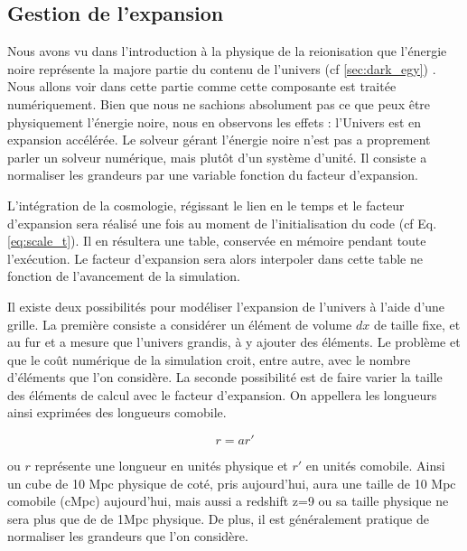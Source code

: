 \subsection{Gestion de l'expansion}
\label{sec:supercomobil}


Nous avons vu dans l'introduction à la physique de la reionisation que l'énergie noire représente la majore partie du contenu de l'univers (cf \ref{sec:dark_egy}) .
Nous allons voir dans cette partie comme cette composante est traitée numériquement.
Bien que nous ne sachions absolument pas ce que peux être physiquement l'énergie noire, nous en observons les effets : l'Univers est en expansion accélérée.
Le solveur gérant l'énergie noire n'est pas a proprement parler un solveur numérique, mais plutôt d'un système d'unité. %
Il consiste a normaliser les grandeurs par une variable fonction du facteur d'expansion.

L'intégration de la cosmologie, régissant le lien en le temps et le facteur d'expansion sera réalisé une fois au moment de l'initialisation du code (cf Eq. \ref{eq:scale_t}).
Il en résultera une table, conservée en mémoire pendant toute l'exécution.
Le facteur d'expansion sera alors interpoler dans cette table ne fonction de l'avancement de la simulation.%

Il existe deux possibilités pour modéliser l'expansion de l'univers à l'aide d'une grille.
La première consiste a considérer un élément de volume $dx$ de taille fixe, et au fur et a mesure que l'univers grandis, à y ajouter des éléments.
Le problème et que le coût numérique de la simulation croit, entre autre, avec le nombre d'éléments que l'on considère.
La seconde possibilité est de faire varier la taille des éléments de calcul avec le facteur d'expansion.
On appellera les longueurs ainsi exprimées des longueurs comobile.

\begin{equation}
r=a r'
\end{equation}

ou $r$ représente une longueur en unités physique et $r'$ en unités comobile.
Ainsi un cube de 10 Mpc physique de coté, pris aujourd'hui, aura une taille de 10 Mpc comobile (cMpc) aujourd'hui, mais aussi a redshift z=9 ou sa taille physique ne sera plus que de de 1Mpc physique.
De plus, il est généralement pratique de normaliser les grandeurs que l'on considère. 


